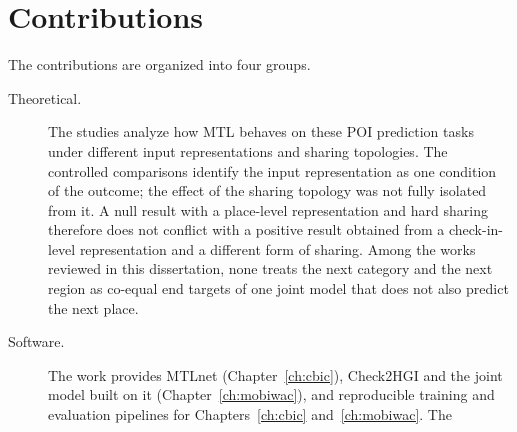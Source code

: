 \section{Contributions}
\label{sec:intro:contributions}

The contributions are organized into four groups.

\begin{description}
    \item[Theoretical.] The studies analyze how MTL behaves on these POI prediction tasks
    under different input representations and sharing topologies. The controlled
    comparisons identify the input representation as one condition of the outcome; the
    effect of the sharing topology was not fully isolated from it. A null result
    with a place-level representation and hard sharing therefore does not conflict
    with a positive result obtained from a check-in-level representation and a
    different form of sharing. Among the works reviewed in this dissertation, none treats
    the next category and the next region as co-equal end targets of one joint model that
    does not also predict the next place.
    \item[Software.] The work provides MTLnet (Chapter~\ref{ch:cbic}), Check2HGI and the
    joint model built on it (Chapter~\ref{ch:mobiwac}), and reproducible training
    and evaluation pipelines for Chapters~\ref{ch:cbic} and~\ref{ch:mobiwac}. The

\end{description}
